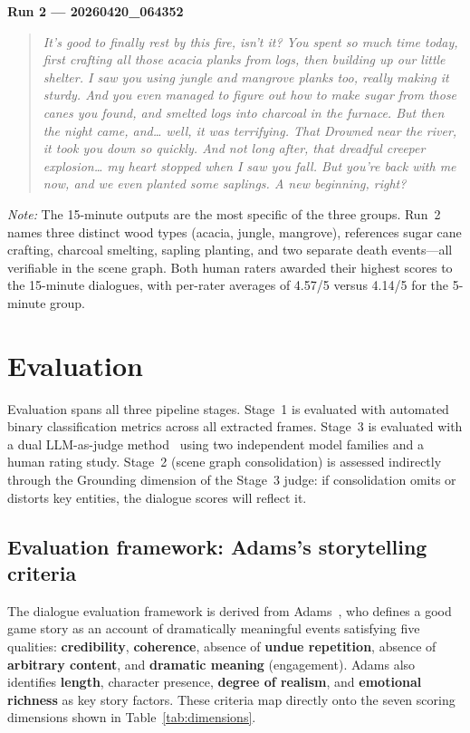 \documentclass[11pt]{article}
\begin{document}
\textbf{Run 2 --- 20260420\_064352}
\begin{quote}\itshape
It's good to finally rest by this fire, isn't it? You spent so much time today, first
crafting all those acacia planks from logs, then building up our little shelter. I saw
you using jungle and mangrove planks too, really making it sturdy. And you even managed
to figure out how to make sugar from those canes you found, and smelted logs into
charcoal in the furnace. But then the night came, and\ldots{} well, it was terrifying.
That Drowned near the river, it took you down so quickly. And not long after, that
dreadful creeper explosion\ldots{} my heart stopped when I saw you fall. But you're
back with me now, and we even planted some saplings. A new beginning, right?
\end{quote}

\noindent\textit{Note:} The 15-minute outputs are the most specific of the three groups. Run~2 names three distinct wood types (acacia, jungle, mangrove), references sugar cane crafting, charcoal smelting, sapling planting, and two separate death events---all verifiable in the scene graph. Both human raters awarded their highest scores to the 15-minute dialogues, with per-rater averages of 4.57/5 versus 4.14/5 for the 5-minute group.

\section{Evaluation}

Evaluation spans all three pipeline stages. Stage~1 is evaluated with automated binary classification metrics across all extracted frames. Stage~3 is evaluated with a dual LLM-as-judge method~\cite{Zheng2023} using two independent model families and a human rating study. Stage~2 (scene graph consolidation) is assessed indirectly through the Grounding dimension of the Stage~3 judge: if consolidation omits or distorts key entities, the dialogue scores will reflect it.

\subsection{Evaluation framework: Adams's storytelling criteria}

The dialogue evaluation framework is derived from Adams~\cite{Adams2014}, who defines a good game story as an account of dramatically meaningful events satisfying five qualities: \textbf{credibility}, \textbf{coherence}, absence of \textbf{undue repetition}, absence of \textbf{arbitrary content}, and \textbf{dramatic meaning} (engagement). Adams also identifies \textbf{length}, character presence, \textbf{degree of realism}, and \textbf{emotional richness} as key story factors. These criteria map directly onto the seven scoring dimensions shown in Table~\ref{tab:dimensions}.
\end{document}
